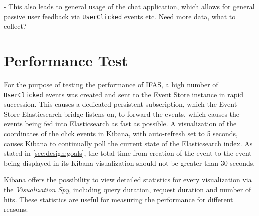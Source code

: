 - This also leads to general usage of the chat application, which allows for general passive user feedback via \texttt{UserClicked} events etc.
Need more data, what to collect?

%

\section{Performance Test}
\label{sec:evaluation:performance}

For the purpose of testing the performance of \ac{IFAS}, a high number of \texttt{UserClicked} events was created and sent to the Event Store instance in rapid succession.
This causes a dedicated persistent subscription, which the Event Store-Elasticsearch bridge listens on, to forward the events, which causes the events being fed into Elasticsearch as fast as possible.
A visualization of the coordinates of the click events in Kibana, with auto-refresh set to 5 seconds, causes Kibana to continually poll the current state of the Elasticsearch index.
As stated in \cref{sec:design:goals}, the total time from creation of the event to the event being displayed in its Kibana visualization should not be greater than 30 seconds.

Kibana offers the possibility to view detailed statistics for every visualization via the \emph{Visualization Spy}, including query duration, request duration and number of hits.
These statistics are useful for measuring the performance for different reasons:

